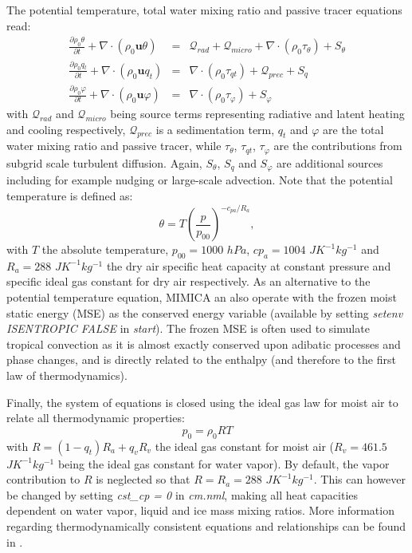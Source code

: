 \documentclass[12pt,A4,french]{article}
\begin{document}
The potential temperature, total water mixing ratio and passive tracer equations read:
\begin{eqnarray}
\frac{\partial \rho_0 \theta}{\partial t} + \nabla\cdot\left(\rho_0 \mathbf{u} \theta\right) &=& {\mathcal Q}_{rad} + {\mathcal Q}_{micro} + \nabla\cdot\left(\rho_0 \tau_{\theta}\right) + S_\theta \\
\frac{\partial \rho_0 q_t}{\partial t} + \nabla\cdot\left(\rho_0 \mathbf{u} q_t\right) &=& \nabla\cdot\left(\rho_0 \tau_{qt}\right) + {\mathcal Q}_{prec} + S_q \\
\frac{\partial \rho_0 \varphi}{\partial t} + \nabla\cdot\left(\rho_0 \mathbf{u} \varphi\right) &=& \nabla\cdot\left(\rho_0 \tau_{\varphi}\right) + S_\varphi
\end{eqnarray}
with ${\mathcal Q}_{rad}$ and ${\mathcal Q}_{micro}$ being source terms representing radiative and latent heating and cooling respectively, ${\mathcal Q}_{prec}$ is a sedimentation term, $q_t$ and $\varphi$ are the total water mixing ratio and passive tracer, while $\tau_{\theta}$, $\tau_{qt}$, $\tau_{\varphi}$ are the contributions from subgrid scale turbulent diffusion. Again, $S_\theta$, $S_q$ and $S_\varphi$ are additional sources including for example nudging or large-scale advection. Note that the potential temperature is defined as:
\begin{equation}
\theta = T\left(\frac{p}{p_{00}}\right)^{-c_{pa}/R_a},
\end{equation}
with $T$ the absolute temperature, $p_{00} = 1000$ $hPa$, $cp_a=1004$ $J K^{-1} kg^{-1}$ and $R_a = 288$ $J K^{-1} kg^{-1}$ the dry air specific heat capacity at constant pressure and specific ideal gas constant for dry air respectively. As an alternative to the potential temperature equation, MIMICA an also operate with the frozen moist static energy (MSE) as the conserved energy variable (available by setting {\it setenv ISENTROPIC FALSE} in {\it start}). The frozen MSE is often used to simulate tropical convection as it is almost exactly conserved upon adibatic processes and phase changes, and is directly related to the enthalpy (and therefore to the first law of thermodynamics).

Finally, the system of equations is closed using the ideal gas law for moist air to relate all thermodynamic properties:
\begin{equation}
p_0 = \rho_0 R T
\end{equation}
with $R = \left(1-q_t\right)R_a + q_v R_v$ the ideal gas constant for moist air ($R_v = 461.5$ $J K^{-1} kg^{-1}$ being the ideal gas constant for water vapor). By default, the vapor contribution to $R$ is neglected so that $R = R_a = 288$ $J K^{-1} kg^{-1}$. This can however be changed by setting {\it cst\_cp = 0} in {\it cm.nml}, making all heat capacities dependent on water vapor, liquid and ice mass mixing ratios. More information regarding thermodynamically consistent equations and relationships can be found in \cite{Sat2003}. 
\end{document}
